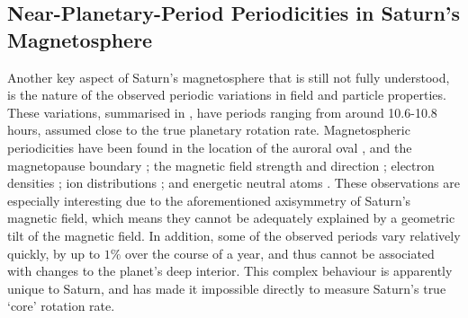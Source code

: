 \subsection{Near-Planetary-Period Periodicities in Saturn's Magnetosphere}\label{intro:sec:periodicities}
Another key aspect of Saturn's magnetosphere that is still not fully understood, is the nature of the observed periodic variations in field and particle properties. These variations, summarised in \citet{carbary2013}, have periods ranging from around 10.6-10.8 hours, assumed close to the true planetary rotation rate. Magnetospheric periodicities have been found in the location of the auroral oval \citep{provan2009b}, and the magnetopause boundary \citep{clarke2010}; the magnetic field strength and direction \citep{espinosa2000, andrews2008}; electron densities \citep{morooka2009}; ion distributions \citep{burch2009}; and energetic neutral atoms \citep{paranicas2005}. These observations are especially interesting due to the aforementioned axisymmetry of Saturn's magnetic field, which means they cannot be adequately explained by a geometric tilt of the magnetic field. In addition, some of the observed periods vary relatively quickly, by up to $1\%$ over the course of a year, and thus cannot be associated with changes to the planet's deep interior. This complex behaviour is apparently unique to Saturn, and has made it impossible directly to measure Saturn's true `core' rotation rate.

